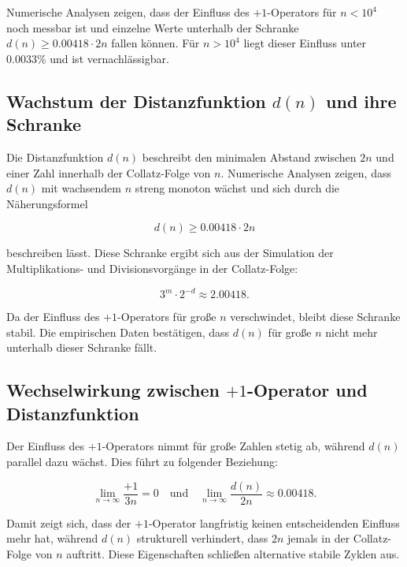 \documentclass[a4paper,12pt]{article}
\begin{document}
Numerische Analysen zeigen, dass der Einfluss des \( +1 \)-Operators für \( n < 10^4 \) noch messbar ist und einzelne Werte unterhalb der Schranke \( d(n) \geq 0.00418 \cdot 2n \) fallen können. Für \( n > 10^4 \) liegt dieser Einfluss unter 0.0033\% und ist vernachlässigbar.

\subsection{Wachstum der Distanzfunktion \( d(n) \) und ihre Schranke}

Die Distanzfunktion \( d(n) \) beschreibt den minimalen Abstand zwischen \( 2n \) und einer Zahl innerhalb der Collatz-Folge von \( n \). Numerische Analysen zeigen, dass \( d(n) \) mit wachsendem \( n \) streng monoton wächst und sich durch die Näherungsformel

\begin{equation} 
    d(n) \geq 0.00418 \cdot 2n
\end{equation}

beschreiben lässt. Diese Schranke ergibt sich aus der Simulation der Multiplikations- und Divisionsvorgänge in der Collatz-Folge:

\begin{equation}
    3^m \cdot 2^{-d} \approx 2.00418.
\end{equation}

Da der Einfluss des \( +1 \)-Operators für große \( n \) verschwindet, bleibt diese Schranke stabil. Die empirischen Daten bestätigen, dass \( d(n) \) für große \( n \) nicht mehr unterhalb dieser Schranke fällt.

\subsection{Wechselwirkung zwischen \( +1 \)-Operator und Distanzfunktion}

Der Einfluss des \( +1 \)-Operators nimmt für große Zahlen stetig ab, während \( d(n) \) parallel dazu wächst. Dies führt zu folgender Beziehung:

\begin{equation} 
    \lim_{n \to \infty} \frac{+1}{3n} = 0 \quad \text{und} \quad \lim_{n \to \infty} \frac{d(n)}{2n} \approx 0.00418.
\end{equation}

Damit zeigt sich, dass der \( +1 \)-Operator langfristig keinen entscheidenden Einfluss mehr hat, während \( d(n) \) strukturell verhindert, dass \( 2n \) jemals in der Collatz-Folge von \( n \) auftritt. Diese Eigenschaften schließen alternative stabile Zyklen aus.
\end{document}
